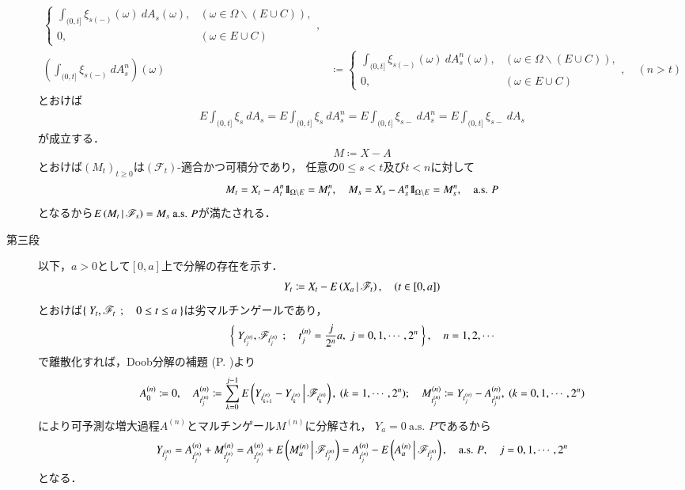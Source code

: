 \begin{prf}[未修正]
\begin{description}
\begin{align}
\begin{cases}
						\displaystyle\int_{(0,t]} \xi_{s(-)}(\omega)\ dA_s(\omega), & (\omega \in \Omega \backslash (E \cup C)), \\
						0, & (\omega \in E \cup C)
					\end{cases}, \\
					\left( \int_{(0,t]} \xi_{s(-)}\ dA^n_s \right)(\omega) &\coloneqq
					\begin{cases}
						\displaystyle\int_{(0,t]} \xi_{s(-)}(\omega)\ dA^n_s(\omega), & (\omega \in \Omega \backslash (E \cup C)), \\
						0, & (\omega \in E \cup C)
					\end{cases},
					\quad (n > t)
				\end{align}
				とおけば
				\begin{align}
					E \int_{(0,t]} \xi_s\ dA_s = E \int_{(0,t]} \xi_s\ dA^n_s 
					= E \int_{(0,t]} \xi_{s-}\ dA^n_s = E \int_{(0,t]} \xi_{s-}\ dA_s
				\end{align}
				が成立する．
				\begin{align}
					M \coloneqq X - A
				\end{align}
				とおけば$(M_t)_{t \geq 0}$は$(\mathscr{F}_t)$-適合かつ可積分であり，
				任意の$0 \leq s < t$及び$t < n$に対して
				\begin{align}
					M_t = X_t - A^n_t \mbox{1}\hspace{-0.25em}\mbox{l}_{\Omega \backslash E} = M^n_t,
					\quad M_s = X_s - A^n_s \mbox{1}\hspace{-0.25em}\mbox{l}_{\Omega \backslash E} = M^n_s,
					\quad \mbox{a.s. $P$}
				\end{align}
				となるから$E\left( M_t \, \middle|\, \mathscr{F}_s \right) = M_s\ \mbox{a.s. $P$}$が満たされる．
			
			\item[第三段]
				以下，$a > 0$として$[0,a]$上で分解の存在を示す．
				\begin{align}
					Y_t \coloneqq X_t - E\left( X_a \, \middle|\, \mathscr{F}_t \right),
					\quad (t \in [0,a])
				\end{align}
				とおけば$\left\{\ Y_t,\mathscr{F}_t\ \, ; \quad 0 \leq t \leq a\ \right\}$は劣マルチンゲールであり，
				\begin{align}
					\left\{\ Y_{t^{(n)}_j},\mathscr{F}_{t^{(n)}_j}\ \, ; \quad t^{(n)}_j = \frac{j}{2^n}a,\ j=0,1,\cdots,2^n\ \right\},
					\quad n=1,2,\cdots
				\end{align}
				で離散化すれば，Doob分解の補題 (P. \pageref{lem:Doob_decomposition})より
				\begin{align}
					A^{(n)}_0 \coloneqq 0,
					\quad A^{(n)}_{t^{(n)}_j} \coloneqq \sum_{k=0}^{j-1} E\left( Y_{t^{(n)}_{k+1}} - Y_{t^{(n)}_k} \, \middle|\, \mathscr{F}_{t^{(n)}_k} \right),
					\ (k=1,\cdots,2^n);
					\quad M^{(n)}_{t^{(n)}_j} \coloneqq Y_{t^{(n)}_j} - A^{(n)}_{t^{(n)}_j},
					\ (k=0,1,\cdots,2^n)
				\end{align}
				により可予測な増大過程$A^{(n)}$とマルチンゲール$M^{(n)}$に分解され，
				$Y_a = 0\ \mbox{a.s. $P$}$であるから
				\begin{align}
					Y_{t^{(n)}_j} = A^{(n)}_{t^{(n)}_j} +  M^{(n)}_{t^{(n)}_j}
					= A^{(n)}_{t^{(n)}_j} + E\left( M^{(n)}_a \, \middle|\, \mathscr{F}_{t^{(n)}_j} \right)
					= A^{(n)}_{t^{(n)}_j} - E\left( A^{(n)}_a \, \middle|\, \mathscr{F}_{t^{(n)}_j} \right),
					\quad \mbox{a.s. $P$},
					\quad j=0,1,\cdots,2^n
				\end{align}
				となる．
				

\end{description}
\end{prf}
